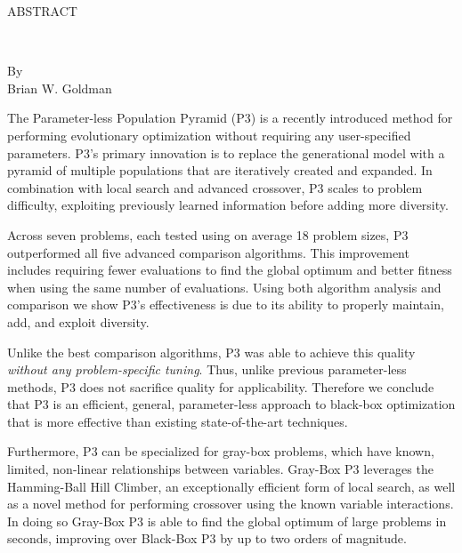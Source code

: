 \thispagestyle{empty} \setcounter{page}{2}
\begin{doublespace}
\begin{centering}
ABSTRACT\\ %
\begin{singlespace}
\MyTitle\\ %
\end{singlespace}
By \\ %
Brian W. Goldman\\ %
\end{centering}

The Parameter-less Population Pyramid (P3) is a recently introduced method for performing
evolutionary optimization without requiring any user-specified parameters.
P3's primary innovation is to replace the generational model with a pyramid of
multiple populations that are iteratively created and expanded. In combination
with local search and advanced crossover,
P3 scales to problem difficulty, exploiting
previously learned information before adding more diversity.

Across seven problems, each tested using on average 18 problem sizes, P3 outperformed
all five advanced comparison algorithms. This improvement includes requiring fewer evaluations
to find the global optimum and better fitness when using
the same number of evaluations. Using both algorithm analysis and comparison we show P3's
effectiveness is due to its ability to properly maintain, add, and exploit diversity.

Unlike the best comparison algorithms, P3 was able to achieve this quality
\textit{without any
problem-specific tuning}. Thus, unlike previous parameter-less methods, P3 does not
sacrifice quality for applicability. Therefore we conclude that
P3 is an efficient, general, parameter-less approach to black-box
optimization that is more effective than existing state-of-the-art techniques.

Furthermore, P3 can be specialized for gray-box problems, which have
known, limited, non-linear relationships
between variables.
Gray-Box P3 leverages the Hamming-Ball Hill Climber, an exceptionally efficient
form of local search, as well as a novel method for performing crossover using the
known variable interactions. In doing so Gray-Box P3 is able to find the global
optimum of large problems in seconds, improving over Black-Box P3 by up to
two orders of magnitude.

\end{doublespace}
\newpage
